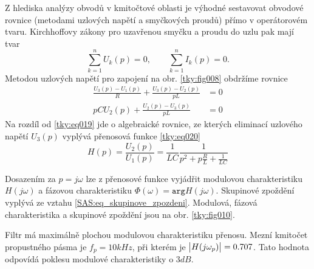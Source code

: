 \begin{mdframed}[style=mdexam]
\begin{example}
      {\centering
      \captionsetup{type=figure}
      \label{tky:fig009}
      \par}
    
    Z hlediska analýzy obvodů v kmitočtové oblasti je výhodné sestavovat obvodové rovnice (metodami
    uzlových napětí a smyčkových proudů) přímo v operátorovém tvaru. Kirchhoffovy zákony pro
    uzavřenou smyčku a proudu do uzlu pak mají tvar $$\sum_{k=1}^{n}U_k(p) = 0, \qquad
    \sum_{k=1}^{n}I_k(p) = 0.$$ Metodou uzlových napětí pro zapojení na obr. \ref{tky:fig008}
    obdržíme rovnice
    \begin{align}
      \frac{U_3(p)-U_1(p)}{R}+\frac{U_3(p)-U_2(p)}{pL} &=  0 \\
      pCU_2(p) + \frac{U_2(p)-U_3(p)}{pL}              &=  0 
    \end{align}
    Na rozdíl od \ref{tky:eq019} jde o algebraické rovnice, ze kterých eliminací uzlového napětí
    $U_3(p)$ vyplývá přenosová funkce \ref{tky:eq020} $$H(p) = \frac{U_2(p)}{U_1(p)} =
    \frac{1}{LC}\frac{1}{p^2+p\frac{R}{L} + \frac{1}{LC}}$$
    
    {\centering
      \captionsetup{type=figure}
      \label{tky:fig010}
      \par}    
    
    Dosazením za $p=j\omega$ lze z přenosové funkce vyjádřit modulovou charakteristiku $H(j\omega)$
    a fázovou charakteristiku $\Phi(\omega)= \texttt{arg} H(j\omega)$. Skupinové zpoždění vyplývá ze
    vztahu \ref{SAS:eq_skupinove_zpozdeni}. Modulová, fázová charakteristika a skupinové zpoždění
    jsou na obr. \ref{tky:fig010}.
    
    Filtr má maximálně plochou modulovou charakteristiku přenosu. Mezní kmitočet propustného pásma
    je $f_p = 10 kHz$, při kterém je $\left\lvert H(j\omega_p)\right\rvert= 0.707$. Tato hodnota odpovídá poklesu
    modulové charakteristiky o $3 dB$.
    
    
  \end{example} 
\end{mdframed}